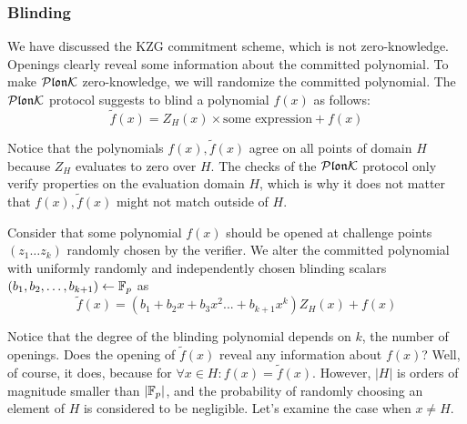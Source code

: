 


\subsubsection{Blinding}
\label{sec:blinding}
We have discussed the KZG commitment scheme, which is not zero-knowledge. Openings clearly reveal some information about the committed polynomial. To make $\mathcal{P}\mathfrak{lon}\mathcal{K}$ zero-knowledge, we will randomize the committed polynomial. The $\mathcal{P}\mathfrak{lon}\mathcal{K}$ protocol  suggests to blind a polynomial $f(x)$ as follows: $$\widetilde{f}(x) = Z_H(x) \times \text{some expression} + f(x)$$

Notice that the polynomials $f(x), \widetilde{f}(x)$ agree on all points of domain $H$ because $Z_H$ evaluates to zero over $H$. The checks of the $\mathcal{P}\mathfrak{lon}\mathcal{K}$ protocol only verify properties on the evaluation domain $H$, which is why it does not matter that $f(x), \widetilde{f}(x)$ might not match outside of $H$.

Consider that some polynomial $f(x)$ should be opened at challenge points $(z_1 \ldots z_{k})$ randomly chosen by the verifier. We alter the committed polynomial with uniformly randomly and independently chosen blinding scalars $(b_1, b_2, \ldots, b_{k+1}) \gets \mathbb{F}_p$ as $$\widetilde{f}(x) = (b_1 + b_2x + b_3x^2 ... + b_{k+1}x^{k})Z_H(x) + f(x)$$

Notice that the degree of the blinding polynomial depends on $k$, the number of openings. Does the opening of $\widetilde{f}(x)$ reveal any information about $f(x)$? Well, of course, it does, because for $\forall x \in H: f(x) = \widetilde{f}(x)$. However, $|H|$ is orders of magnitude smaller than $|\mathbb{F}_p|$, and the probability of randomly choosing an element of $H$ is considered to be negligible. Let's examine the case when $x \neq H$.

